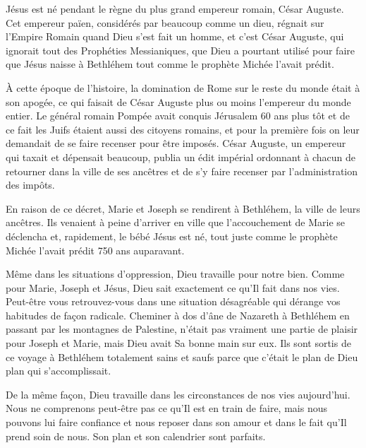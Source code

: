 

Jésus est né pendant le règne du plus grand empereur romain, César Auguste. Cet empereur païen, considérés par beaucoup comme un dieu, régnait sur l'Empire Romain quand Dieu s'est fait un homme, et c'est César Auguste, qui ignorait tout des Prophéties Messianiques, que Dieu a pourtant utilisé pour faire que Jésus naisse à Bethléhem tout comme le prophète Michée l'avait prédit.

À cette époque de l'histoire, la domination de Rome sur le reste du monde était à son apogée, ce qui faisait de César Auguste plus ou moins l'empereur du monde entier. Le général romain Pompée avait conquis Jérusalem 60 ans plus tôt et de ce fait les Juifs étaient aussi des citoyens romains, et pour la première fois on leur demandait de se faire recenser pour être imposés. César Auguste, un empereur qui taxait et dépensait beaucoup, publia un édit impérial ordonnant à chacun de retourner dans la ville de ses ancêtres et de s'y faire recenser par l'administration des impôts.

En raison de ce décret, Marie et Joseph se rendirent à Bethléhem, la ville de leurs ancêtres. Ils venaient à peine d'arriver en ville que l'accouchement de Marie se déclencha et, rapidement, le bébé Jésus est né, tout juste comme le prophète Michée l'avait prédit 750 ans auparavant.

Même dans les situations d'oppression, Dieu travaille pour notre bien. Comme pour Marie, Joseph et Jésus, Dieu sait exactement ce qu'Il fait dans nos vies. Peut-être vous retrouvez-vous dans une situation désagréable qui dérange vos habitudes de façon radicale. Cheminer à dos d'âne de Nazareth à Bethléhem en passant par les montagnes de Palestine, n'était pas vraiment une partie de plaisir pour Joseph et Marie, mais Dieu avait Sa bonne main sur eux. Ils sont sortis de ce voyage à Bethléhem totalement sains et saufs parce que c'était le plan de Dieu plan qui s'accomplissait.

De la même façon, Dieu travaille dans les circonstances de nos vies aujourd'hui. Nous ne comprenons peut-être pas ce qu'Il est en train de faire, mais nous pouvons lui faire confiance et nous reposer dans son amour et dans le fait qu'Il prend soin de nous. Son plan et son calendrier sont parfaits.


